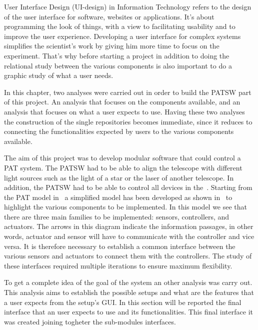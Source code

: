 User Interface Design (UI-design) in Information Technology refers to the design of the user interface for software, websites or applications. It’s about programming the look of things, with a view to facilitating usability and to improve the user experience. Developing a user interface for complex systems simplifies the scientist’s work by giving him more time to focus on the experiment.
That’s why before starting a project in addition to doing the relational study between the various components is also important to do a graphic study of what a user needs.

In this chapter, two analyses were carried out in order to build the PATSW part of this project. An analysis that focuses on the components available, and an analysis that focuses on what a user expects to use. Having these two analyses the construction of the single repositories becomes immediate, since it reduces to connecting the functionalities expected by users to the various components available.


\newpage

The aim of this project was to develop modular software that could control a PAT system. The PATSW had to be able to align the telescope with different light sources such as the light of a star or the laser of another telescope.
In addition, the PATSW had to be able to control all devices in the~.
Starting from the PAT model in~ a simplified model has been developed as shown in~ to highlight the various components to be implemented.
In this model we see that there are three main families to be implemented: sensors, controllers, and actuators. The arrows in this diagram indicate the information passages, in other words, actuator and sensor will have to communicate with the controller and vice versa.
It is therefore necessary to establish a common interface between the various sensors and actuators to connect them with the controllers. The study of these interfaces required multiple iterations to ensure maximum flexibility.

To get a complete idea of the goal of the system an other analysis was carry out. This analysis aims to establish the possible setups and what are the features that a user expects from the setup's GUI.
In this section will be reported the final interface that an user expects to use and its functionalities. This final interface it was created joining togheter the sub-modules interfaces.

